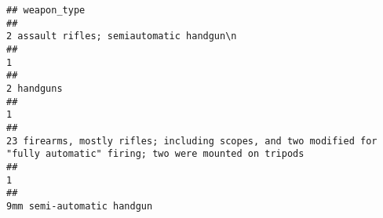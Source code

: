 \documentclass[
]{article}
\begin{document}
\begin{verbatim}
## weapon_type
##                                                                                                                                                                                                                                                                                                                                                             2 assault rifles; semiautomatic handgun\n 
##                                                                                                                                                                                                                                                                                                                                                                                                     1 
##                                                                                                                                                                                                                                                                                                                                                                                            2 handguns 
##                                                                                                                                                                                                                                                                                                                                                                                                     1 
##                                                                                                                                                                                                                                                                              23 firearms, mostly rifles; including scopes, and two modified for "fully automatic" firing; two were mounted on tripods 
##                                                                                                                                                                                                                                                                                                                                                                                                     1 
##                                                                                                                                                                                                                                                                                                                                                                            9mm semi-automatic handgun 

\end{verbatim}
\end{document}
